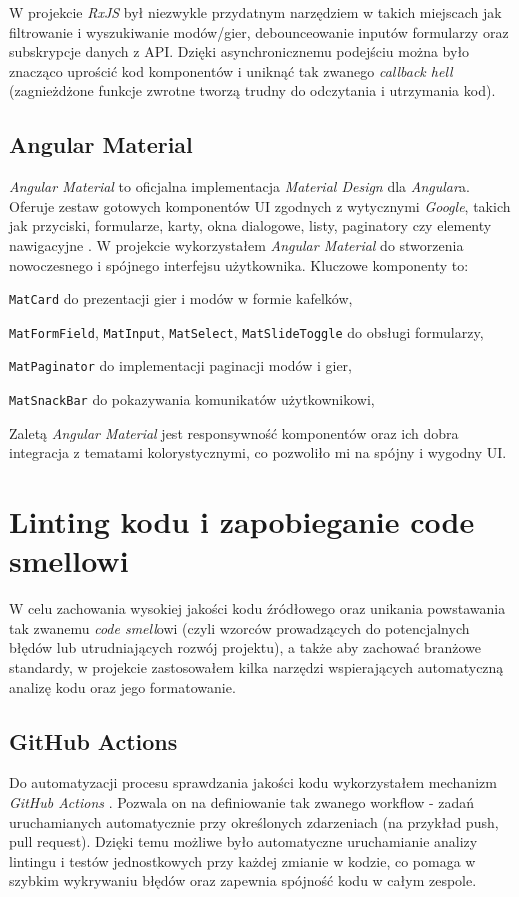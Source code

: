\documentclass[a4paper,twoside,12pt]{book}
\begin{document}
W projekcie \textit{RxJS} był niezwykle przydatnym narzędziem w takich miejscach jak filtrowanie i wyszukiwanie modów/gier, debounceowanie inputów formularzy oraz subskrypcje danych z API. Dzięki asynchronicznemu podejściu można było znacząco uprościć kod komponentów i uniknąć tak zwanego \textit{callback hell} (zagnieżdżone funkcje zwrotne tworzą trudny do odczytania i utrzymania kod).

\subsection{Angular Material}

\textit{Angular Material} to oficjalna implementacja \textit{Material Design} dla \textit{Angular}a. Oferuje zestaw gotowych komponentów UI zgodnych z wytycznymi \textit{Google}, takich jak przyciski, formularze, karty, okna dialogowe, listy, paginatory czy elementy nawigacyjne \cite{angularmaterial2025}. W projekcie wykorzystałem \textit{Angular Material} do stworzenia nowoczesnego i spójnego interfejsu użytkownika. Kluczowe komponenty to:

    \texttt{MatCard} do prezentacji gier i modów w formie kafelków,

    \texttt{MatFormField}, \texttt{MatInput}, \texttt{MatSelect}, \texttt{MatSlideToggle} do obsługi formularzy,

    \texttt{MatPaginator} do implementacji paginacji modów i gier,

    \texttt{MatSnackBar} do pokazywania komunikatów użytkownikowi,

Zaletą \textit{Angular Material} jest responsywność komponentów oraz ich dobra integracja z tematami kolorystycznymi, co pozwoliło mi na spójny i wygodny UI.

\section{Linting kodu i zapobieganie code smellowi}
W celu zachowania wysokiej jakości kodu źródłowego oraz unikania powstawania tak zwanemu \textit{code smell}owi (czyli wzorców prowadzących do potencjalnych błędów lub utrudniających rozwój projektu), a także aby zachować branżowe standardy, w projekcie zastosowałem kilka narzędzi wspierających automatyczną analizę kodu oraz jego formatowanie.

\subsection{GitHub Actions}
Do automatyzacji procesu sprawdzania jakości kodu wykorzystałem mechanizm \textit{GitHub Actions} \cite{githubactions2025}. Pozwala on na definiowanie tak zwanego workflow - zadań uruchamianych automatycznie przy określonych zdarzeniach (na przykład push, pull request). Dzięki temu możliwe było automatyczne uruchamianie analizy lintingu i testów jednostkowych przy każdej zmianie w kodzie, co pomaga w szybkim wykrywaniu błędów oraz zapewnia spójność kodu w całym zespole.
\end{document}
